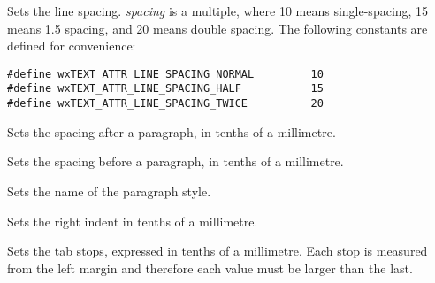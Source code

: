 
Sets the line spacing. {\it spacing} is a multiple, where 10 means single-spacing,
15 means 1.5 spacing, and 20 means double spacing. The following constants are
defined for convenience:

{\small
\begin{verbatim}
#define wxTEXT_ATTR_LINE_SPACING_NORMAL         10
#define wxTEXT_ATTR_LINE_SPACING_HALF           15
#define wxTEXT_ATTR_LINE_SPACING_TWICE          20
\end{verbatim}
}

\label{wxrichtextattrsetparagraphspacingafter}


Sets the spacing after a paragraph, in tenths of a millimetre.

\label{wxrichtextattrsetparagraphspacingbefore}


Sets the spacing before a paragraph, in tenths of a millimetre.

\label{wxrichtextattrsetparagraphstylename}


Sets the name of the paragraph style.

\label{wxrichtextattrsetrightindent}


Sets the right indent in tenths of a millimetre.

\label{wxrichtextattrsettabs}


Sets the tab stops, expressed in tenths of a millimetre.
Each stop is measured from the left margin and therefore each value must be larger than the last.

\label{wxrichtextattrsettextcolour}


